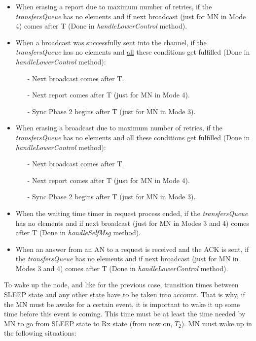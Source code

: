 \begin{itemize}
  \item When erasing a report due to maximum number of retries, if the \textit{transfersQueue} has no elements and if next broadcast (just for 
  \ac{MN} in Mode 4) comes after T (Done in \textit{handleLowerControl} method).

  \item When a broadcast was successfully sent into the channel, if the \textit{transfersQueue} has no elements and \underline{all} these 
  conditions get fulfilled (Done in \textit{handleLowerControl} method):
    \begin{itemize}
      \item[-] Next broadcast comes after T.
      \item[-] Next report comes after T (just for \ac{MN} in Mode 4).
      \item[-] Sync Phase 2 begins after T (just for \ac{MN} in Mode 3).
    \end{itemize}

  \item When erasing a broadcast due to maximum number of retries, if the \textit{transfersQueue} has no elements and \underline{all} these 
  conditions get fulfilled (Done in \textit{handleLowerControl} method):
    \begin{itemize}
      \item[-] Next broadcast comes after T.
      \item[-] Next report comes after T (just for \ac{MN} in Mode 4).
      \item[-] Sync Phase 2 begins after T (just for \ac{MN} in Mode 3).
    \end{itemize}

  \item When the waiting time timer in request process ended, if the \textit{transfersQueue} has no elements and if next broadcast (just for \ac{MN} in 
  Modes 3 and 4) comes after T (Done in \textit{handleSelfMsg} method).

  \item When an answer from an \ac{AN} to a request is received and the \ac{ACK} is sent, if the \textit{transfers\-Queue} has no elements and 
  if next broadcast (just for \ac{MN} in Modes 3 and 4) comes after T (Done in \textit{handleLowerControl} method).
\end{itemize}

To wake up the node, and like for the previous case, transition times between SLEEP state and any other state have to be taken into account. That 
is why, if the \ac{MN} must be awake for a certain event, it is important to wake it up some time before this event is coming. This time must be 
at least the time needed by \ac{MN} to go from SLEEP state to \ac{Rx} state (from now on, $T_2$). \ac{MN} must wake up in the following situations:

